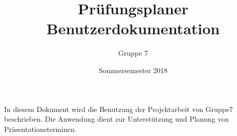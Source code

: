 \documentclass{scrartcl}
\begin{document}
	\title{Prüfungsplaner \\ Benutzerdokumentation}
	\author{Gruppe 7}
	\date{Sommersemester 2018}
	\maketitle
	
	 In diesem Dokument wird die Benutzung der Projektarbeit von Gruppe7 beschrieben. Die Anwendung dient zur Unterstützung und Planung von Präsentationsterminen.
	
	\tableofcontents
	
	
	
\end{document}
